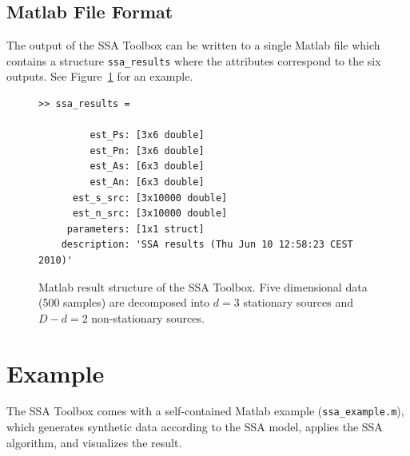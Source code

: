 \documentclass{article}
\newcommand{\1}{\ensuremath{\mathds{1}}}
\newcommand{\0}{\ensuremath{0}}
\begin{document}
\subsection{Matlab File Format}

The output of the SSA Toolbox can be written to a single Matlab file which contains
a structure \texttt{ssa\_results} where the attributes correspond to the six outputs. 
See Figure~\ref{fig:ex_matlab_res} for an example.

\begin{figure}[h]
\centering
\begin{boxedminipage}{12cm}
\begin{verbatim}
>> ssa_results = 

         est_Ps: [3x6 double]
         est_Pn: [3x6 double]
         est_As: [6x3 double]
         est_An: [6x3 double]
      est_s_src: [3x10000 double]
      est_n_src: [3x10000 double]
     parameters: [1x1 struct]
    description: 'SSA results (Thu Jun 10 12:58:23 CEST 2010)'
\end{verbatim}
\end{boxedminipage}
\caption{
Matlab result structure of the SSA Toolbox. Five dimensional data (500 samples) 
are decomposed into $d = 3$ stationary sources and $D-d = 2$ non-stationary sources.
\label{fig:ex_matlab_res}
}
\end{figure}

\FloatBarrier %

\section{Example}

The SSA Toolbox comes with a self-contained Matlab example (\texttt{ssa\_example.m}), which 
generates synthetic data according to the SSA model, applies the SSA algorithm, and visualizes the result.
\end{document}
